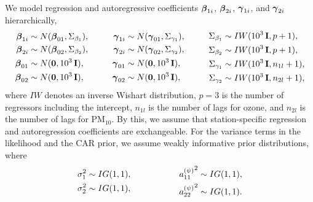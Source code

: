 \documentclass[alpha-refs]{wiley-article}
\newcommand{\bbeta}{ \mbox{\boldmath $ \beta $} }
\newcommand{\bgamma}{ \mbox{\boldmath $\gamma$} }
\newcommand{\bzero}{\textbf{0}}
\newcommand{\bI}{\textbf{I}}
\begin{document}
We model regression and autoregressive coefficients $\bbeta_{1i}$, $\bbeta_{2i}$, $\bgamma_{1i}$, and $\bgamma_{2i}$ hierarchically,
\begin{equation}
\begin{aligned}[c]
\bbeta_{1i} &\sim N(\bbeta_{01} , \Sigma_{\beta_1} ), \\
\bbeta_{2i} &\sim N(\bbeta_{02} ,\Sigma_{\beta_2} ), \\
\bbeta_{01} &\sim N(\bzero, 10^3 \, \bI ), \\
\bbeta_{02} &\sim N(\bzero, 10^3 \, \bI ), \\
\end{aligned}
\hspace{10mm}
\begin{aligned}[c]
\bgamma_{1i} &\sim N(\bgamma_{01} , \Sigma_{\gamma_1} ), \\
\bgamma_{2i} &\sim N(\bgamma_{02} ,\Sigma_{\gamma_2} ), \\
\bgamma_{01} &\sim N(\bzero, 10^3 \, \bI), \\
\bgamma_{02} &\sim N(\bzero, 10^3 \, \bI), \\
\end{aligned}
\hspace{10mm}
\begin{aligned}[c]
\Sigma_{\beta_1} &\sim IW(10^3 \, \bI ,p + 1), \\
\Sigma_{\beta_2} &\sim IW(10^3 \, \bI , p + 1 ), \\
\Sigma_{\gamma_1} &\sim IW(10^3 \, \bI ,n_{1l} + 1), \\
\Sigma_{\gamma_2} &\sim IW(10^3 \, \bI , n_{2l} + 1 ), \\
\end{aligned}
\end{equation}
where $IW$ denotes an inverse Wishart distribution,  $p = 3$ is the number of regressors including the intercept, $n_{1l}$ is the number of lags for ozone, and $n_{2l}$ is the number of lags for $\text{PM}_{10}$. By this, we assume that station-specific regression and autoregression coefficients are exchangeable. For the variance terms in the likelihood and the CAR prior, we assume weakly informative prior distributions, where
\begin{equation}
\begin{aligned}[c]
\sigma_1^2 &\sim IG(1,1), \\
\sigma_2^2 &\sim IG(1,1), \\
\end{aligned}
\hspace{20mm}
\begin{aligned}[c]
{a^{(\psi)}_{11}}^2 &\sim IG(1,1), \\
{a^{(\psi)}_{22}}^2  &\sim IG(1,1). \\
\end{aligned}
\end{equation}
\end{document}
